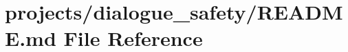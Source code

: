 \hypertarget{projects_2dialogue__safety_2README_8md}{}\section{projects/dialogue\+\_\+safety/\+R\+E\+A\+D\+ME.md File Reference}
\label{projects_2dialogue__safety_2README_8md}
